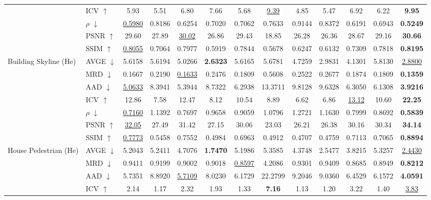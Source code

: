 \begin{table}[t]
{\begin{tabular}{llccccccccccc}
 & ICV $\uparrow$ & 5.93 & 5.51 & 6.80 & 7.66 & 5.68 & \underline{9.39} & 4.85 & 5.47 & 6.92 & 6.22 & \textbf{9.95} \\
 & $\rho$ $\downarrow$ & \underline{0.5980} & 0.8186 & 0.6254 & 0.7020 & 0.7062 & 0.7633 & 0.9144 & 0.8372 & 0.6191 & 0.6943 & \textbf{0.5249} \\
 & PSNR $\uparrow$ & 29.60 & 27.89 & \underline{30.02} & 26.86 & 29.43 & 18.85 & 26.28 & 26.36 & 28.67 & 29.16 & \textbf{30.66} \\
 & SSIM $\uparrow$ & \underline{0.8055} & 0.7064 & 0.7977 & 0.5919 & 0.7844 & 0.5678 & 0.6247 & 0.6132 & 0.7309 & 0.7818 & \textbf{0.8195} \\
\midrule
\multirow{7}{*}{Building Skyline (He)} & AVGE $\downarrow$ & 5.6158 & 5.6194 & 5.0266 & \textbf{2.6323} & 5.6165 & 5.6781 & 4.7259 & 2.9831 & 4.1301 & 5.8130 & \underline{2.8800} \\
 & MRD $\downarrow$ & 0.1667 & 0.2190 & \underline{0.1633} & 0.2476 & 0.1809 & 0.5608 & 0.2522 & 0.2677 & 0.1874 & 0.1809 & \textbf{0.1359} \\
 & AAD $\downarrow$ & \underline{5.0633} & 8.3941 & 5.3944 & 8.7322 & 6.2938 & 13.3711 & 9.8128 & 9.6328 & 6.3050 & 6.1308 & \textbf{3.9216} \\
 & ICV $\uparrow$ & 12.86 & 7.58 & 12.47 & 8.12 & 10.54 & 8.89 & 6.62 & 6.86 & \underline{13.12} & 10.60 & \textbf{22.25} \\
 & $\rho$ $\downarrow$ & \underline{0.7160} & 1.1392 & 0.7697 & 0.9658 & 0.9059 & 1.0796 & 1.2721 & 1.1630 & 0.7999 & 0.8692 & \textbf{0.5839} \\
 & PSNR $\uparrow$ & \underline{32.05} & 27.49 & 31.42 & 27.15 & 30.06 & 23.03 & 26.21 & 26.38 & 30.16 & 30.34 & \textbf{34.14} \\
 & SSIM $\uparrow$ & \underline{0.7773} & 0.5458 & 0.7552 & 0.4984 & 0.6963 & 0.4912 & 0.4707 & 0.4759 & 0.7113 & 0.7065 & \textbf{0.8894} \\
\midrule
\multirow{7}{*}{House Pedestrian (He)} & AVGE $\downarrow$ & 5.2043 & 5.2411 & 4.7076 & \textbf{1.7470} & 5.1986 & 5.3585 & 4.3748 & 2.5477 & 3.8215 & 5.3257 & \underline{2.4430} \\
 & MRD $\downarrow$ & 0.9411 & 0.9199 & 0.9002 & 0.9018 & \underline{0.8597} & 4.2086 & 0.9301 & 0.9409 & 0.8685 & 0.8949 & \textbf{0.8212} \\
 & AAD $\downarrow$ & 5.7351 & 8.8920 & \underline{5.7109} & 8.0230 & 6.1729 & 22.2799 & 9.2046 & 9.0360 & 6.4529 & 6.1572 & \textbf{4.0591} \\
 & ICV $\uparrow$ & 2.14 & 1.17 & 2.32 & 1.93 & 1.33 & \textbf{7.16} & 1.13 & 1.20 & 3.22 & 1.40 & \underline{3.83} \\

\end{tabular}}
\end{table}
